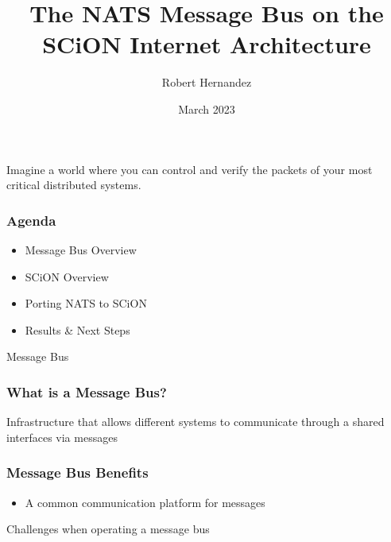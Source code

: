 \documentclass[aspectratio=169]{beamer}
\title[Default Options]{The NATS Message Bus on the SCiON Internet Architecture }
\author{
  Robert Hernandez
}
\institute{
  Martincoit Networks
}
\date{March 2023}
\begin{document}
\maketitle

\begin{frame}
  Imagine a world where you can control and verify the packets of your most critical distributed systems.
  \note[item]{}
\end{frame}

\begin{frame}
\frametitle{Agenda}
  \begin{itemize}[<alert@+>]
    \item Message Bus Overview
    \item SCiON Overview
    \item Porting NATS to SCiON
    \item Results \& Next Steps
  \end{itemize}
\end{frame}

\begin{frame}[c]
  \begin{center}
    \Huge{Message Bus}
  \end{center}
\end{frame}

\begin{frame}
\frametitle{What is a Message Bus?}
  Infrastructure that allows different systems to communicate through a shared interfaces via messages
\end{frame}

\begin{frame}
\frametitle{Message Bus Benefits}
  \begin{itemize}[<alert@+>]
    \item A common communication platform for messages
    \note[item]{}
  \end{itemize}
\end{frame}

\begin{frame}[c]
  \begin{center}
    \Huge{Challenges when operating a message bus}
  \end{center}
\end{frame}
\end{document}
